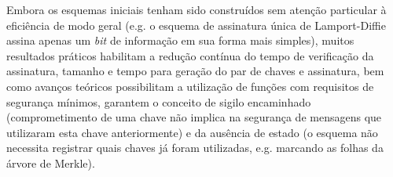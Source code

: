 \documentclass{article}
\begin{document}
Embora os esquemas iniciais tenham sido construídos sem atenção particular
à eficiência de modo geral (e.g. o esquema de assinatura única de
Lamport-Diffie \cite{Lamport1979} assina apenas um \emph{bit} de informação
em sua forma mais simples), muitos resultados práticos habilitam a redução
contínua do tempo de verificação da assinatura, tamanho e tempo para
geração do par de chaves e assinatura, bem como avanços teóricos possibilitam
a utilização de funções com requisitos de segurança mínimos, garantem o conceito de sigilo encaminhado
(comprometimento de uma chave não implica na segurança de mensagens que
utilizaram esta chave anteriormente) e da ausência de estado (o esquema não
necessita registrar quais chaves já foram utilizadas, e.g. marcando as folhas
da árvore de Merkle).




\end{document}
